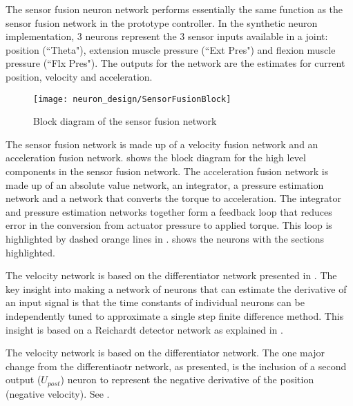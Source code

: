 
The sensor fusion neuron network performs essentially the same function as the
sensor fusion network in the prototype controller. In the synthetic neuron implementation, 3 neurons
represent the 3 sensor inputs available in a joint: position (``Theta"),
extension muscle pressure (``Ext Pres") and flexion muscle pressure
(``Flx Pres"). The outputs for the network are the estimates for current 
position, velocity and acceleration.

\begin{figure}
\centering
\texttt{[image: neuron\_design/SensorFusionBlock]}
\caption{Block diagram of the sensor fusion network}
\label{fig:SensorFusionBlock}
\end{figure}

The sensor fusion network is made up of a velocity fusion network and an acceleration fusion network.
 shows the block diagram for the high level components in the sensor fusion network.
The acceleration fusion network is made up of an absolute value network, an integrator, a pressure estimation network and a network that converts the torque to acceleration. The integrator and pressure estimation networks together form a feedback loop that reduces error in the conversion from actuator pressure to applied torque. This loop is highlighted by dashed orange lines in .
 shows the neurons with the sections highlighted.



The velocity network is based on the differentiator network presented in 
\cite{NickFunctionalSubnetwork}. The key insight into making a network
of neurons that can estimate the derivative of an input signal is that
the time constants of individual neurons can be independently tuned to 
approximate a single step finite difference method. This insight is based
on a Reichardt detector network as explained in
\cite{NickFunctionalSubnetwork}.


The velocity network is based on the differentiator network. 
The one major change from the differentiaotr network,
as presented, is the inclusion of a second output ($U_{post}$) neuron to 
represent the negative derivative of the position (negative velocity). See .

